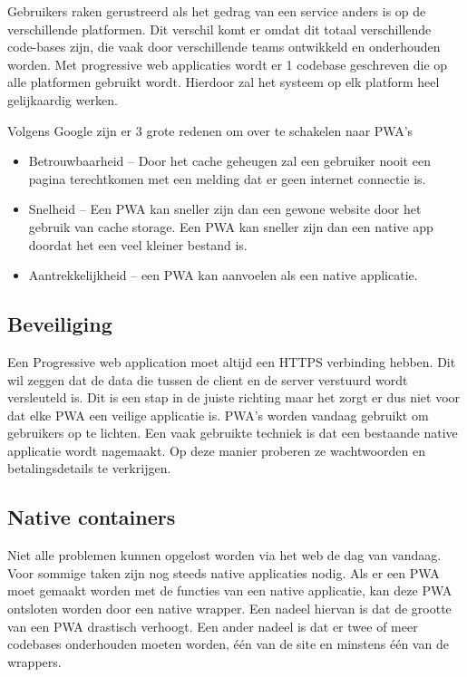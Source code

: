Gebruikers raken gerustreerd als het gedrag van een service anders is op de verschillende platformen. Dit verschil komt er omdat dit totaal verschillende code-bases zijn, die vaak door verschillende teams ontwikkeld en onderhouden worden. Met progressive web applicaties wordt er 1 codebase geschreven die op alle platformen gebruikt wordt. Hierdoor zal het systeem op elk platform heel gelijkaardig werken.
\autocite{Google2019}

Volgens Google zijn er 3 grote redenen om over te schakelen naar PWA’s

\begin{itemize}
    \item Betrouwbaarheid – Door het cache geheugen zal een gebruiker nooit een pagina terechtkomen met een melding dat er geen internet connectie is.
    \item Snelheid – Een PWA kan sneller zijn dan een gewone website door het gebruik van cache storage. Een PWA kan sneller zijn dan een native app doordat het een veel kleiner bestand is.
    \item Aantrekkelijkheid – een PWA kan aanvoelen als een native applicatie.
\end{itemize}
\autocite{GooglePwa2019}

\subsection{Beveiliging}
Een Progressive web application moet altijd een HTTPS verbinding hebben. Dit wil zeggen dat de data die tussen de client en de server verstuurd wordt versleuteld is.
\autocite{Durumeric2013}
Dit is een stap in de juiste richting maar het zorgt er dus niet voor dat elke PWA een veilige applicatie is. PWA’s worden vandaag gebruikt om gebruikers op te lichten. Een vaak gebruikte techniek is dat een bestaande native applicatie wordt nagemaakt. Op deze manier proberen ze wachtwoorden en betalingsdetails te verkrijgen.
\autocite{Lee2018}

\subsection{Native containers}
Niet alle problemen kunnen opgelost worden via het web de dag van vandaag. Voor sommige taken zijn nog steeds native applicaties nodig. Als er een PWA moet gemaakt worden met de functies van een native applicatie, kan deze PWA ontsloten worden door een native wrapper.
Een nadeel hiervan is dat de grootte van een PWA drastisch verhoogt.
Een ander nadeel is dat er twee of meer codebases onderhouden moeten worden, één van de site en minstens één van de wrappers.
\autocite{Richard2019}



